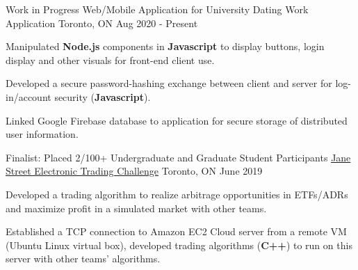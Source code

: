 

\begin{cventries}

  \cventry
    {Work in Progress Web/Mobile Application for University Dating} %
    {Work Application} %
    {Toronto, ON} %
    {Aug 2020 - Present} %
    {
      \begin{cvitems} %
        \item {Manipulated \textbf{Node.js} components in \textbf{Javascript} to display buttons, login display and other visuals for front-end client use.}
        \item {Developed a secure password-hashing exchange between client and server for log-in/account security (\textbf{Javascript}).}
        \item {Linked Google Firebase database to application for secure storage of distributed user information.}
      \end{cvitems}
    }

  \cventry
    {Finalist: Placed 2/100+ Undergraduate and Graduate Student Participants} %
    {\href{https://github.com/SamWeninger/Jane_Street_ETC}{Jane Street Electronic Trading Challenge}} %
    {Toronto, ON} %
    {June 2019} %
    {
      \begin{cvitems} %
        \item {Developed a trading algorithm to realize arbitrage opportunities in ETFs/ADRs and maximize profit in a simulated market with other teams.}
        \item {Established a TCP connection to Amazon EC2 Cloud server from a remote VM (Ubuntu Linux virtual box), developed trading algorithms (\textbf{C++}) to run on this server with other teams' algorithms.}
      \end{cvitems}
    }


\end{cventries}
